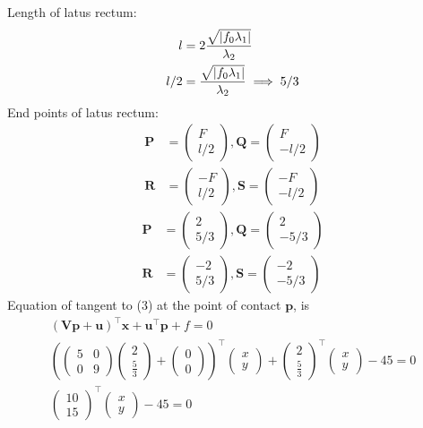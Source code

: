 \documentclass[10pt, a4paper]{article}
\providecommand{\brak}[1]{\ensuremath{\left(#1\right)}}
\newcommand{\myvec}[1]{\ensuremath{\begin{pmatrix}#1\end{pmatrix}}}
\let\vec\mathbf
\begin{document}
	 Length of latus rectum:
	 \begin{align}
	 l&=2\frac{\sqrt{\abs{f_0\lambda_1}}}{\lambda_2}\\
	  l/2&=\frac{\sqrt{\abs{f_0\lambda_1}}}{\lambda_2}\implies 5/3
	  \end{align} 
End points of latus rectum:
\begin{align}
\vec{P}&=\myvec{F\\l/2},\vec{Q}=\myvec{F\\-l/2}\\\vec{R}&=\myvec{-F\\l/2},\vec{S}=\myvec{-F\\-l/2}
\end{align}
\begin{align}
\vec{P}&=\myvec{2\\5/3},\vec{Q}=\myvec{2\\-5/3}\\\vec{R}&=\myvec{-2\\5/3},\vec{S}=\myvec{-2\\-5/3}
\end{align}
%
Equation of tangent to (3) at the point of contact $\vec{p}$, is 
\begin{align}
  \brak{\vec{V}\vec{p}+\vec{u}}^{\top}\vec{x}+\vec{u}^{\top}\vec{p}+f = 0 \\
 \brak{\myvec{5 & 0 \\
		 0 & 9}\myvec{2 \\
		              \frac{5}{3}}+\myvec{0\\0}}^{\top}
		               \myvec{x \\
		                      y}+\myvec{2 \\
		                             \frac{5}{3}}^{\top}\myvec{x \\
		                                                  y}-45=0\\
\myvec{10\\15}^{\top}\myvec{x \\
		                    y}-45=0
\end{align}
\end{document}
